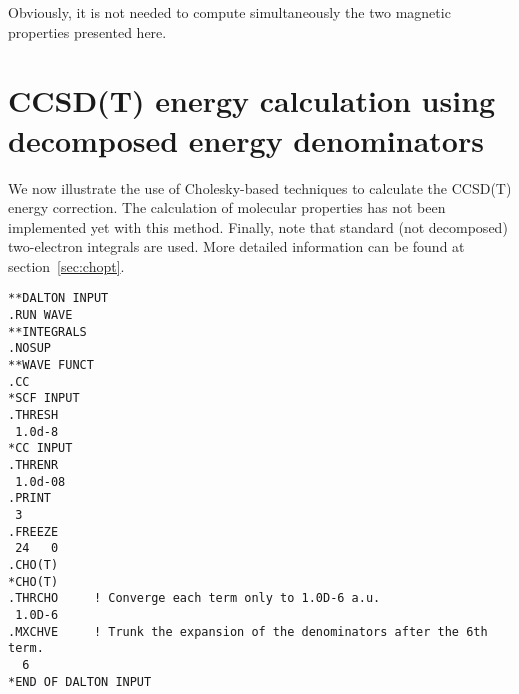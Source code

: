 Obviously, it is not needed to compute simultaneously the two
magnetic properties presented here.

\section{CCSD(T) energy calculation using decomposed 
         energy denominators}

We now illustrate the use of Cholesky-based techniques to calculate
the CCSD(T) energy correction. The calculation of molecular 
properties has not been implemented yet with this method. Finally,
note that standard (not decomposed) two-electron integrals are 
used. More detailed information can be found at section~\ref{sec:chopt}.

\begin{verbatim}
**DALTON INPUT
.RUN WAVE
**INTEGRALS
.NOSUP
**WAVE FUNCT
.CC
*SCF INPUT
.THRESH
 1.0d-8
*CC INPUT
.THRENR
 1.0d-08
.PRINT
 3
.FREEZE
 24   0
.CHO(T)
*CHO(T)
.THRCHO     ! Converge each term only to 1.0D-6 a.u.
 1.0D-6
.MXCHVE     ! Trunk the expansion of the denominators after the 6th term.
  6
*END OF DALTON INPUT
\end{verbatim}
